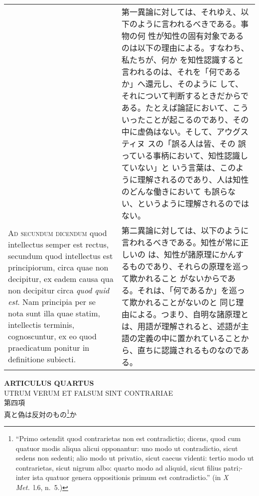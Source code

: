 \documentclass[paper=a4paper,fontsize=10pt,jafontsize=9pt,titlepage]{jlreq}
\begin{document}
\begin{longtable}{p{21em}p{21em}}
&

第一異論に対しては、それゆえ、以下のように言われるべきである。事物の何
性が知性の固有対象であるのは以下の理由による。すなわち、私たちが、何か
を知性認識すると言われるのは、それを「何であるか」へ還元し、そのように
して、それについて判断するときだからである。たとえば論証において、こう
いったことが起こるのであり、その中に虚偽はない。そして、アウグスティヌ
スの「誤る人は皆、その 誤っている事柄において、知性認識していない」と
いう言葉は、このように理解されるのであり、人は知性のどんな働きにおいて
も誤らない、というように理解されるのではない。

\\


{\scshape Ad secundum dicendum} quod intellectus semper est rectus,
secundum quod intellectus est principiorum, circa quae non decipitur,
ex eadem causa qua non decipitur circa {\itshape quod quid est}. Nam
principia per se nota sunt illa quae statim, intellectis terminis,
cognoscuntur, ex eo quod praedicatum ponitur in definitione subiecti.


&

第二異論に対しては、以下のように言われるべきである。知性が常に正しいの
は、知性が諸原理にかんするものであり、それらの原理を巡って欺かれること
がないからである。それは、「何であるか」を巡って欺かれることがないのと
同じ理由による。つまり、自明な諸原理とは、用語が理解されると、述語が主
語の定義の中に置かれていることから、直ちに認識されるものなのである。

\end{longtable}
\newpage


\begin{center}
 {\Large {\bfseries ARTICULUS QUARTUS}}\\
 {\large UTRUM VERUM ET FALSUM SINT CONTRARIAE}\\

 {\Large 第四項\\真と偽は反対のもの\footnote { ``Primo ostendit quod
contrarietas non est contradictio; dicens, quod cum quatuor modis
aliqua alicui opponantur: uno modo ut contradictio, sicut sedens non
sedenti; alio modo ut privatio, sicut caecus videnti: tertio modo ut
contrarietas, sicut nigrum albo: quarto modo ad aliquid, sicut filius
patri;- inter ista quatuor genera oppositionis primum est
contradictio.'' (in {\itshape X Met.}~l.6, n.~5.)  }か}
\end{center}
\end{document}
